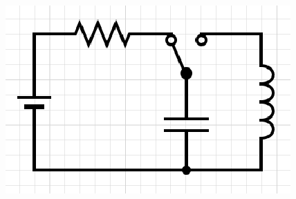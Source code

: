 \documentclass{scrartcl}
\begin{document}
    \begin{figure}[H]
        \centering
        \includegraphics[scale=1.5]{ex.eps}
    \end{figure}
\end{document}

